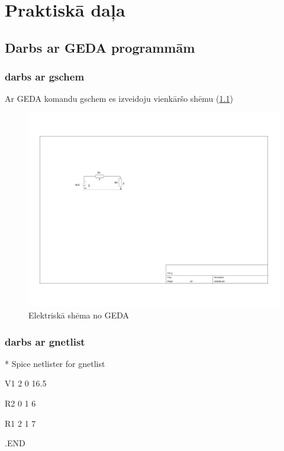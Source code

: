 \documentclass{report}
\begin{document}
\chapter{Praktiskā daļa}
\section{Darbs ar GEDA programmām}
\subsection{darbs ar gschem}
Ar GEDA komandu gschem es izveidoju vienkāršo shēmu (\ref{GEDA Shema})
\begin{figure}[!tb]
\includegraphics[width=\textwidth,height=\textheight,keepaspectratio]{01.png}
\caption{Elektriskā shēma no GEDA}
\label{GEDA Shema}
\end{figure}
\subsection{darbs ar gnetlist}
\begin{flushleft}
* Spice netlister for gnetlist  

V1 2 0 16.5  

R2 0 1 6  

R1 2 1 7  

.END  
  
\end{flushleft}
\end{document}
